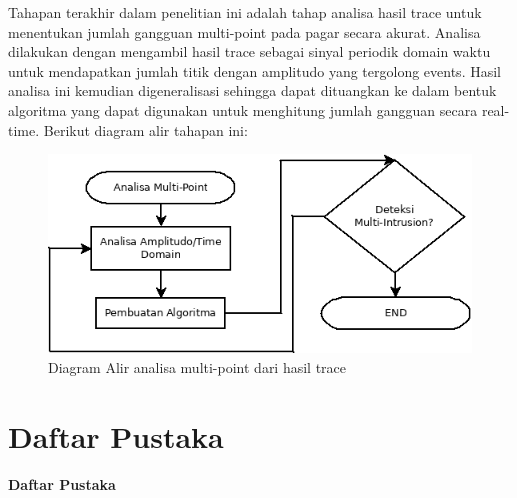 \documentclass[12pt]{article}
\begin{document}
	Tahapan terakhir dalam penelitian ini adalah tahap analisa hasil trace untuk menentukan jumlah gangguan multi-point pada pagar secara akurat.
	Analisa dilakukan dengan mengambil hasil trace sebagai sinyal periodik domain waktu untuk mendapatkan jumlah titik dengan amplitudo yang tergolong events.
	Hasil analisa ini kemudian digeneralisasi sehingga dapat dituangkan ke dalam bentuk algoritma yang dapat digunakan untuk menghitung jumlah gangguan secara real-time.
	Berikut diagram alir tahapan ini:
	
	\begin{figure}[h!]
		\centering
		\captionsetup{justification=centering}
		\includegraphics[width=0.8\linewidth]{images/Bab_3/Bab_3_8}
		\caption[Diagram Alir]{\small{Diagram Alir analisa multi-point dari hasil trace}}
	\end{figure}
	

\newpage

	\section{Daftar Pustaka}
	
	\begin{center}
		\textbf{Daftar Pustaka}
	\end{center}
	
	
	

	
\end{document}
